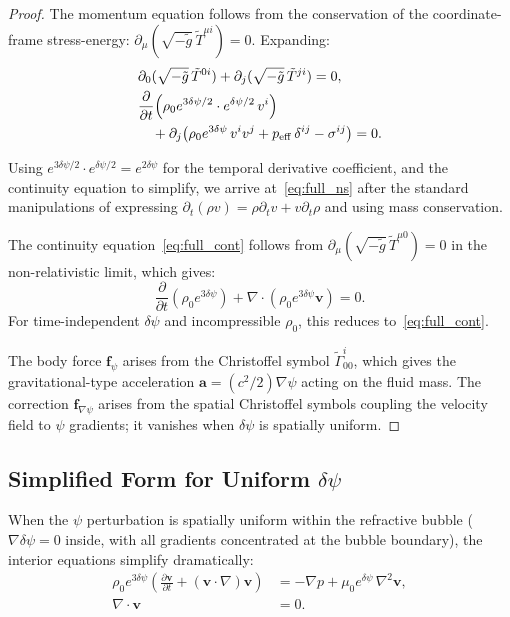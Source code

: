 \documentclass[12pt,twocolumn]{article}
\newcommand{\Reff}{\mathrm{eff}}
\newcommand{\avec}{\mathbf{a}}
\newcommand{\vvec}{\mathbf{v}}
\newcommand{\fvec}{\mathbf{f}}
\newcommand{\dpsi}{\delta\psi}
\begin{document}
\begin{proof}
The momentum equation follows from the conservation of the coordinate-frame
stress-energy: $\partial_\mu(\sqrt{-\tilde{g}}\,\tilde{T}^{\mu i}) = 0$.
Expanding:
\begin{align}
&\partial_0(\sqrt{-\tilde{g}}\,\tilde{T}^{0i})
+ \partial_j(\sqrt{-\tilde{g}}\,\tilde{T}^{ji}) = 0, \notag\\
&\frac{\partial}{\partial t}\!\left(\rho_0 e^{3\dpsi/2}\cdot
e^{\dpsi/2}\,v^i\right) \notag\\
&\quad + \partial_j\!\left(\rho_0 e^{3\dpsi}\,v^i v^j
+ p_\Reff\,\delta^{ij} - \sigma^{ij}\right) = 0.
\end{align}

Using $e^{3\dpsi/2}\cdot e^{\dpsi/2} = e^{2\dpsi}$ for the temporal
derivative coefficient, and the continuity equation to simplify, we arrive
at~\eqref{eq:full_ns} after the standard manipulations of expressing
$\partial_t(\rho v) = \rho\partial_t v + v\partial_t\rho$ and using
mass conservation.

The continuity equation~\eqref{eq:full_cont} follows from
$\partial_\mu(\sqrt{-\tilde{g}}\,\tilde{T}^{\mu 0}) = 0$ in the
non-relativistic limit, which gives:
\begin{equation}
\frac{\partial}{\partial t}(\rho_0 e^{3\dpsi})
+ \nabla\cdot(\rho_0 e^{3\dpsi}\vvec) = 0.
\end{equation}
For time-independent $\dpsi$ and incompressible $\rho_0$, this reduces
to~\eqref{eq:full_cont}.

The body force $\fvec_\psi$ arises from the Christoffel symbol
$\tilde{\Gamma}^i_{00}$, which gives the gravitational-type acceleration
$\avec = (c^2/2)\nabla\psi$ acting on the fluid mass. The correction
$\fvec_{\nabla\psi}$ arises from the spatial Christoffel symbols coupling
the velocity field to $\psi$ gradients; it vanishes when $\dpsi$ is
spatially uniform.
\end{proof}

\subsection{Simplified Form for Uniform $\dpsi$}
\label{sec:uniform_psi}

When the $\psi$ perturbation is spatially uniform within the refractive
bubble ($\nabla\dpsi = 0$ inside, with all gradients concentrated at the
bubble boundary), the interior equations simplify dramatically:
\begin{align}
\rho_0 e^{3\dpsi}\!\left(\frac{\partial\vvec}{\partial t}
+ (\vvec\cdot\nabla)\vvec\right)
&= -\nabla p + \mu_0 e^{\dpsi}\,\nabla^2\vvec, \label{eq:ns_uniform}\\
\nabla\cdot\vvec &= 0. \label{eq:cont_uniform}
\end{align}
\end{document}
